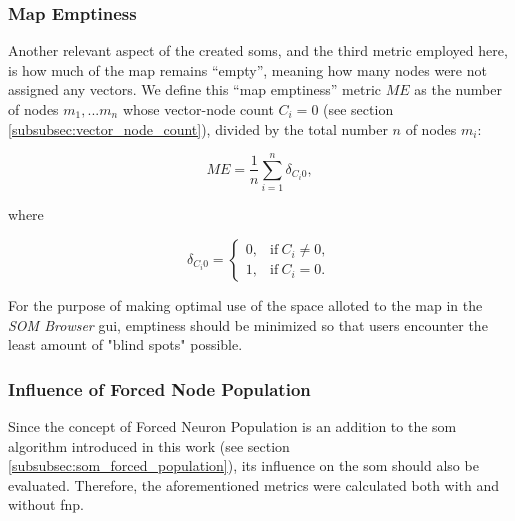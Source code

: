 \subsubsection{Map Emptiness}
\label{subsubsec:map_emptiness}
Another relevant aspect of the created \glspl{som}, and the third metric
employed here, is how much of the map remains ``empty'', meaning how many nodes
were not assigned any vectors. We define this ``map emptiness'' metric $ ME $ as
the number of nodes $ m_1, ... m_n $ whose vector-node count $ C_i = 0 $ (see
section \ref{subsubsec:vector_node_count}), divided by the total number $n$ of
nodes $ m_i $:

\begin{equation}
  ME = \frac{1}{n}\sum\limits_{i=1}^{n}{\delta_{C_i 0}},
\end{equation}

where

\begin{equation}
  \delta_{C_i 0} =
  \begin{cases}
    0, & \text{if}\ C_i \neq 0, \\
    1, & \text{if}\ C_i = 0.
  \end{cases}
\end{equation}

For the purpose of making optimal use of the space alloted to the map in the
\textit{SOM Browser} \gls{gui}, emptiness should be minimized so that users
encounter the least amount of "blind spots" possible.

\subsubsection{Influence of Forced Node Population}
\label{subsubsec:eval_fnp_influence}
Since the concept of Forced Neuron Population is an addition to the \gls{som}
algorithm introduced in this work (see section
\ref{subsubsec:som_forced_population}), its influence on the \gls{som} should
also be evaluated. Therefore, the aforementioned metrics were calculated
both with and without \gls{fnp}.


